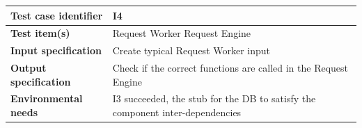 \documentclass[a4paper,11pt]{report} %
\begin{document}
		\begin{center}
			\renewcommand{\arraystretch}{1.2}
			\setlength{\tabcolsep}{24pt}
			\begin{tabular}{ l  p{9cm}}\hline
				\textbf{Test case identifier} & I4\\\hline
				\textbf{Test item(s)} & Request Worker \textrightarrow Request Engine\\\hline
				\textbf{Input specification} & Create typical Request Worker input \\\hline
				\textbf{Output specification} & Check if the correct functions are called in the Request Engine\\\hline
				\textbf{Environmental needs} & I3 succeeded, the stub for the DB to satisfy the component inter-dependencies\\\hline
			\end{tabular}
		\end{center}	
\end{document}
